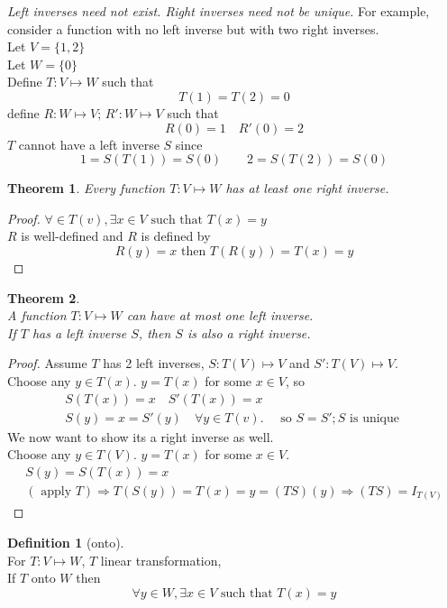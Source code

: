 \documentclass[twoside]{amsart}
\theoremstyle{plain}
\newtheorem{theorem}{Theorem}
\theoremstyle{definition}
\newtheorem{definition}{Definition}
\begin{document}
\textit{Left inverses need not exist.  Right inverses need not be unique.}  For example, consider a function with no left inverse but with two right inverses. \\
Let $V= \{ 1,2 \}$ \\
Let $W = \{ 0 \}$ \\
Define $T:V \mapsto W$ such that 
\[
T(1) = T(2) = 0 
\]
define $R:W \mapsto V; \, R':W \mapsto V$ such that
  \[ R(0) = 1 \quad R'(0) = 2 \] 
$T$ cannot have a left inverse $S$ since 
\[
1 = S(T(1)) = S(0) \quad \quad 2 = S(T(2)) = S(0)
\]

\begin{theorem}
Every function $T:V \mapsto W$ has at least one right inverse.
\end{theorem}
\begin{proof}
$\forall \in T(v), \exists x \in V \text{ such that } T(x) = y$  \\
$R$ is well-defined and $R$ is defined by
\[
R(y) = x \text{ then } T(R(y)) = T(x) = y
\]
\end{proof}

\begin{theorem} \quad \\
  A function $T:V \mapsto W$ can have at most one left inverse.  \\
  If $T$ has a left inverse $S$, then $S$ is also a right inverse. 
\end{theorem}
\begin{proof}
  Assume $T$ has 2 left inverses, $S:T(V) \mapsto V$ and $S':T(V) \mapsto V$.  \\
  Choose any $y \in T(x)$.  $y=T(x)$ for some $x \in V$, so 
\begin{gather*}
  S(T(x)) = x \quad S'(T(x)) = x \\
  S(y) = x = S'(y) \quad \forall y \in T(v).  \quad \text{ so } S= S'; S \text{ is unique }
\end{gather*}
We now want to show its a right inverse as well.  \\
Choose any $y \in T(V)$.  $y=T(x)$ for some $x \in V$.  \\
\begin{gather*}
S(y) = S(T(x)) = x \\
( \text{ apply } T) \Longrightarrow T(S(y)) = T(x) = y = (TS)(y) \Longrightarrow (TS) = I_{T(V)}
\end{gather*}
\end{proof}

\begin{definition}[onto] \quad \\
For $T:V \mapsto W$, $T$ linear transformation, \\
If $T$ onto $W$ then
\[
\forall y \in W, \exists x \in V \text{ such that } T(x) = y
\] 
\end{definition}
\end{document}
